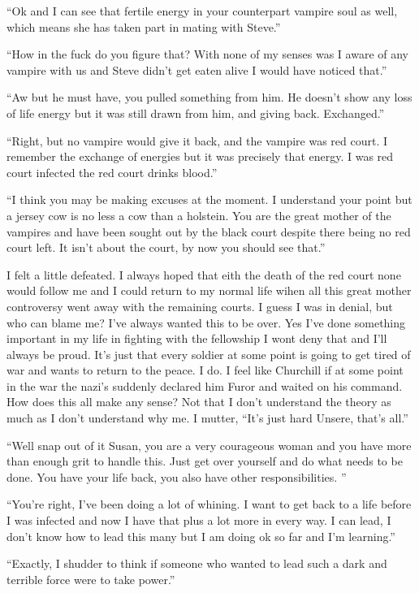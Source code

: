 ``Ok and I can see that fertile energy in your counterpart vampire soul as well, which means she has taken part in mating with Steve.''

``How in the fuck do you figure that? With none of my senses was I aware of any vampire with us and Steve didn't get eaten alive I would have noticed that.''

``Aw but he must have, you pulled something from him. He doesn't show any loss of life energy but it was still drawn from him, and giving back. Exchanged.''

``Right, but no vampire would give it back, and the vampire was red court. I remember the exchange of energies but it was precisely that energy. I was red court infected the red court drinks blood.''

``I think you may be making excuses at the moment. I understand your point but a jersey cow is no less a cow than  a holstein. You are the great mother of the vampires and have been sought out by the black court despite there being no red court left. It isn't about the court, by now you should see that.''

I felt a little defeated. I always hoped that eith the death of the red court none would follow me and I could return to my normal life wihen all this great mother controversy went away with the remaining courts. I guess I was in denial, but who can blame me? I've always wanted this to be over. Yes I've done something important in my life in fighting with the fellowship I wont deny that and I'll always be proud. It's just that every soldier at some point is going to get tired of war and wants to return to the peace. I do. I feel like Churchill if at some point in the war the nazi's suddenly declared him Furor and waited on his command. How does this all make any sense? Not that I don't understand the theory as much as I don't understand why me. I mutter, ``It's just hard Unsere, that's all.''

``Well snap out of it Susan, you are a very courageous woman and you have more than enough grit to handle this. Just get over yourself and do what needs to be done. You have your life back, you also have other responsibilities. ''

``You're right, I've been doing a  lot of whining. I want to get back to a life before I was infected and now I have that plus a lot more in every way. I can lead, I don't know how to lead this many but I am doing ok so far and I'm learning.''

``Exactly, I shudder to think if someone who wanted to lead such a dark and terrible force were to take power.''

